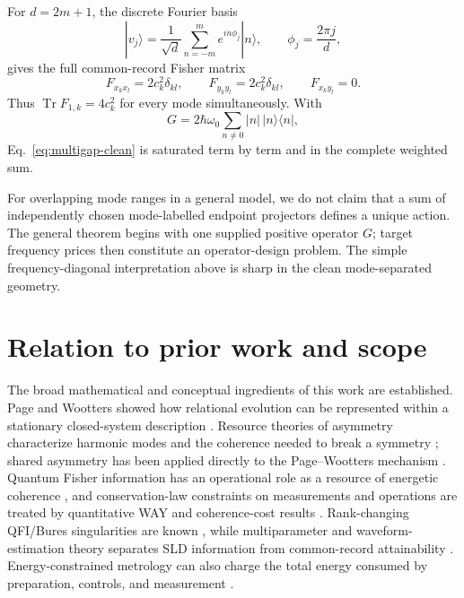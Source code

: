 \documentclass[aps,pra,preprint,nofootinbib]{revtex4-2}
\newcommand{\Tr}{\operatorname{Tr}}
\begin{document}
For $d=2m+1$, the discrete Fourier basis
\begin{equation}
|v_j\rangle=\frac1{\sqrt d}\sum_{n=-m}^{m}e^{in\phi_j}|n\rangle,
\qquad \phi_j=\frac{2\pi j}{d},
\end{equation}
gives the full common-record Fisher matrix
\begin{equation}
F_{x_kx_l}=2c_k^2\delta_{kl},\qquad
F_{y_ky_l}=2c_k^2\delta_{kl},\qquad
F_{x_ky_l}=0.
\label{eq:fourier-F}
\end{equation}
Thus $\Tr F_{1,k}=4c_k^2$ for every mode simultaneously.  With
\begin{equation}
G=2\hbar\omega_0\sum_{n\ne0}|n|\,|n\rangle\!\langle n|,
\end{equation}
Eq.~\eqref{eq:multigap-clean} is saturated term by term and in the complete weighted sum.

For overlapping mode ranges in a general model, we do not claim that a sum of independently chosen mode-labelled endpoint projectors defines a unique action.  The general theorem begins with one supplied positive operator $G$; target frequency prices then constitute an operator-design problem.  The simple frequency-diagonal interpretation above is sharp in the clean mode-separated geometry.

\section{Relation to prior work and scope}
\label{sec:prior}

The broad mathematical and conceptual ingredients of this work are established.  Page and Wootters showed how relational evolution can be represented within a stationary closed-system description \cite{PageWootters1983}.  Resource theories of asymmetry characterize harmonic modes and the coherence needed to break a symmetry \cite{MarvianSpekkens2014Modes}; shared asymmetry has been applied directly to the Page--Wootters mechanism \cite{CarmoSoaresPinto2021}.  Quantum Fisher information has an operational role as a resource of energetic coherence \cite{Marvian2022,YamaguchiTajima2023}, and conservation-law constraints on measurements and operations are treated by quantitative WAY and coherence-cost results \cite{MarvianSpekkensWAY2012,TajimaShiraishiSaito2020}.  Rank-changing QFI/Bures singularities are known \cite{Safranek2017}, while multiparameter and waveform-estimation theory separates SLD information from common-record attainability \cite{GillMassar2000,LiEtAl2016,GardnerEtAl2024}.  Energy-constrained metrology can also charge the total energy consumed by preparation, controls, and measurement \cite{ChenYang2026}.
\end{document}
